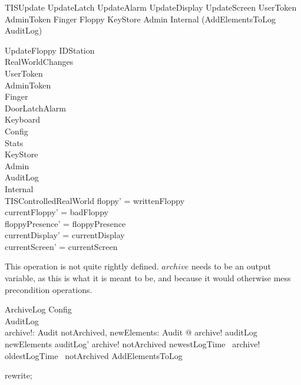 \begin{zed}
TISUpdate  UpdateLatch \land  UpdateAlarm \land  UpdateDisplay \land  UpdateScreen \land  \Xi UserToken \land  \Xi AdminToken \land  \Xi Finger \land  \Xi Floppy \land  \Xi KeyStore \land  \Xi Admin \land  \Xi Internal \land  (AddElementsToLog \lor  \Xi AuditLog)
\end{zed}

\begin{schema}{UpdateFloppy}
  \Delta IDStation\\
  RealWorldChanges\\
  \Xi UserToken\\
  \Xi AdminToken\\
  \Xi Finger\\
  \Xi DoorLatchAlarm\\
  \Xi Keyboard\\
  \Xi Config\\
  \Xi Stats\\
  \Xi KeyStore\\
  \Xi Admin\\
  \Xi AuditLog\\
  \Xi Internal\\
  \Xi TISControlledRealWorld
\where
  floppy' = writtenFloppy\\
  currentFloppy' = badFloppy\\
  floppyPresence' = floppyPresence\\
  currentDisplay' = currentDisplay\\
  currentScreen' = currentScreen
\end{schema}

This operation is not quite rightly defined. $archive$ needs to be an
output variable, as this is what it is meant to be, and because it would
otherwise mess precondition operations.
%
\begin{schema}{ArchiveLog}
  Config\\
  \Delta AuditLog\\
  archive!: \finset  Audit
\where
  \exists  notArchived, newElements: \finset  Audit @
      archive! \subseteq  auditLog \cup  newElements \land
      auditLog' \subseteq  archive! \cup  notArchived \land
      newestLogTime~ archive! \leq  oldestLogTime~ notArchived \land
      AddElementsToLog
\end{schema}

\begin{zproof}
rewrite;
\end{zproof}

